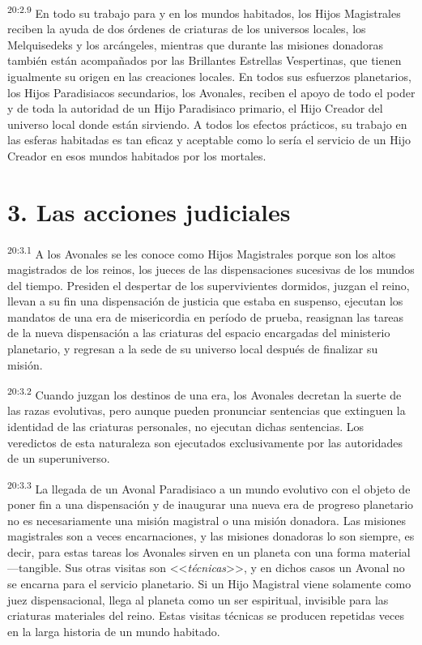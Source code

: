 \par
\textsuperscript{20:2.9} En todo su trabajo para y en los mundos habitados, los Hijos Magistrales reciben la ayuda de dos órdenes de criaturas de los universos locales, los Melquisedeks y los arcángeles, mientras que durante las misiones donadoras también están acompañados por las Brillantes Estrellas Vespertinas, que tienen igualmente su origen en las creaciones locales. En todos sus esfuerzos planetarios, los Hijos Paradisiacos secundarios, los Avonales, reciben el apoyo de todo el poder y de toda la autoridad de un Hijo Paradisiaco primario, el Hijo Creador del universo local donde están sirviendo. A todos los efectos prácticos, su trabajo en las esferas habitadas es tan eficaz y aceptable como lo sería el servicio de un Hijo Creador en esos mundos habitados por los mortales.

\section*{3. Las acciones judiciales}
\par
\textsuperscript{20:3.1} A los Avonales se les conoce como Hijos Magistrales porque son los altos magistrados de los reinos, los jueces de las dispensaciones sucesivas de los mundos del tiempo. Presiden el despertar de los supervivientes dormidos, juzgan el reino, llevan a su fin una dispensación de justicia que estaba en suspenso, ejecutan los mandatos de una era de misericordia en período de prueba, reasignan las tareas de la nueva dispensación a las criaturas del espacio encargadas del ministerio planetario, y regresan a la sede de su universo local después de finalizar su misión.

\par
\textsuperscript{20:3.2} Cuando juzgan los destinos de una era, los Avonales decretan la suerte de las razas evolutivas, pero aunque pueden pronunciar sentencias que extinguen la identidad de las criaturas personales, no ejecutan dichas sentencias. Los veredictos de esta naturaleza son ejecutados exclusivamente por las autoridades de un superuniverso.

\par
\textsuperscript{20:3.3} La llegada de un Avonal Paradisiaco a un mundo evolutivo con el objeto de poner fin a una dispensación y de inaugurar una nueva era de progreso planetario no es necesariamente una misión magistral o una misión donadora. Las misiones magistrales son a veces encarnaciones, y las misiones donadoras lo son siempre, es decir, para estas tareas los Avonales sirven en un planeta con una forma material ---tangible. Sus otras visitas son <<\textit{técnicas}>>, y en dichos casos un Avonal no se encarna para el servicio planetario. Si un Hijo Magistral viene solamente como juez dispensacional, llega al planeta como un ser espiritual, invisible para las criaturas materiales del reino. Estas visitas técnicas se producen repetidas veces en la larga historia de un mundo habitado.

